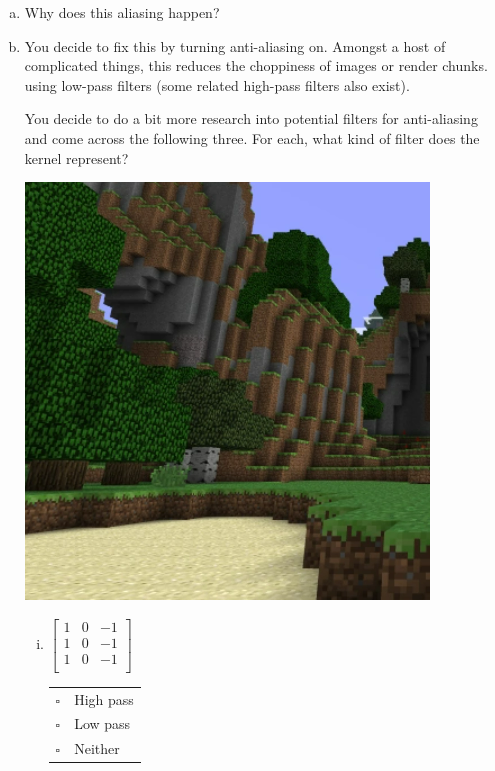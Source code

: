 \begin{enumerate}[(a)]
\item Why does this aliasing happen? 

\item
You decide to fix this by turning anti-aliasing on. Amongst a host of complicated things, this reduces the choppiness of images or render chunks. using low-pass filters (some related high-pass filters also exist).

You decide to do a bit more research into potential filters for anti-aliasing and come across the following three. For each, what kind of filter does the kernel represent?

\includegraphics[width=\linewidth]{images/anti-aliased-minecraft.png}

\begin{enumerate}[(i)]
\item
 $\begin{bmatrix}
    1 & 0 & -1 \\
    1 & 0 & -1 \\
    1 & 0 & -1 \\
 \end{bmatrix}$
\begin{tabular}[h]{ll}
$\square$ & High pass \\
$\square$ & Low pass \\
$\square$ & Neither \\
\end{tabular}


\end{enumerate}
\end{enumerate}
